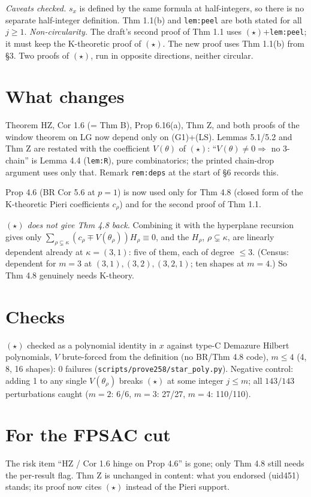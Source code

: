 \documentclass[11pt]{article}
\begin{document}
\emph{Caveats checked.} $s_x$ is defined by the same formula at half-integers, so there is no separate half-integer definition. Thm 1.1(b) and \texttt{lem:peel} are both stated for all $j\ge1$.
\emph{Non-circularity.} The draft's second proof of Thm 1.1 uses $(\star)$+\texttt{lem:peel}; it must keep the K-theoretic proof of $(\star)$. The new proof uses Thm 1.1(b) from \S3. Two proofs of $(\star)$, run in opposite directions, neither circular.

\section*{What changes}
Theorem HZ, Cor 1.6 (= Thm B), Prop 6.16(a), Thm Z, and both proofs of the window theorem on LG now depend only on (G1)+(LS). Lemmas 5.1/5.2 and Thm Z are restated with the coefficient $V(\theta)$ of $(\star)$: ``$V(\theta)\ne0\Rightarrow$ no 3-chain'' is Lemma 4.4 (\texttt{lem:R}), pure combinatorics; the printed chain-drop argument uses only that. Remark \texttt{rem:deps} at the start of \S6 records this.

Prop 4.6 (BR Cor 5.6 at $p=1$) is now used only for Thm 4.8 (closed form of the K-theoretic Pieri coefficients $c_\rho$) and for the second proof of Thm 1.1.

\emph{$(\star)$ does not give Thm 4.8 back.} Combining it with the hyperplane recursion gives only $\sum_{\rho\subsetneq\kappa}(c_\rho\mp V(\theta_\rho))H_\rho\equiv0$, and the $H_\rho$, $\rho\subsetneq\kappa$, are linearly dependent already at $\kappa=(3,1)$: five of them, each of degree $\le3$. (Census: dependent for $m=3$ at $(3,1),(3,2),(3,2,1)$; ten shapes at $m=4$.) So Thm 4.8 genuinely needs K-theory.

\section*{Checks}
$(\star)$ checked as a polynomial identity in $x$ against type-C Demazure Hilbert polynomials, $V$ brute-forced from the definition (no BR/Thm 4.8 code), $m\le4$ (4, 8, 16 shapes): 0 failures (\texttt{scripts/prove258/star\_poly.py}).
Negative control: adding 1 to any single $V(\theta_\rho)$ breaks $(\star)$ at some integer $j\le m$; all $143/143$ perturbations caught ($m=2$: 6/6, $m=3$: 27/27, $m=4$: 110/110).

\section*{For the FPSAC cut}
The risk item ``HZ / Cor 1.6 hinge on Prop 4.6'' is gone; only Thm 4.8 still needs the per-result flag. Thm Z is unchanged in content: what you endorsed (uid451) stands; its proof now cites $(\star)$ instead of the Pieri support.
\end{document}
